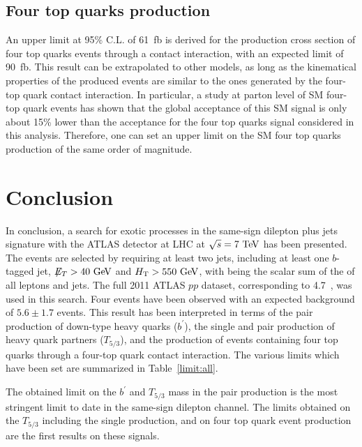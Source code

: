 \subsection{Four top quarks production}
An upper limit
at 95\% C.L. of 61~fb is derived for the production cross section of four top quarks events
through a contact interaction, with an expected limit of 90~fb.
This result can be extrapolated to other models, as long as the kinematical properties of the 
produced events are similar to the ones generated by the four-top quark contact interaction. In
particular, a study at parton level of SM four-top quark events has shown that the
global acceptance of this SM signal is only about 15\% lower than the acceptance
for the four top quarks signal considered in this analysis. Therefore, one can set an upper limit on the
SM four top quarks production of the same order of magnitude.

\section{Conclusion}\label{sect:conclusion}
In conclusion, a search for exotic processes in the same-sign dilepton plus jets signature with the
ATLAS detector at LHC at $\sqrt{s}=7 \TeV$
has been presented. The events are selected by requiring at least two jets, including at
least one $b$-tagged jet, $\met>40 \GeV$ and $\HT>550 \GeV$, with \HT{} being the scalar sum of the \pT{}
of all leptons and jets. The full 2011 ATLAS $pp$ dataset,
corresponding to 4.7~\ifb{}, was used in this search. Four events have been observed with an expected
background of $5.6\pm1.7$ events. This result has been interpreted in terms of the pair production 
of down-type heavy quarks ($b^\prime$), the single and pair production of heavy quark partners
($T_{5/3}$), and the production of events containing four top quarks through a four-top quark
contact interaction. The various limits which have been set are summarized in Table~\ref{limit:all}.

The obtained limit on the $b^\prime$ and $T_{5/3}$ mass in the pair production is the most stringent 
limit to date in the same-sign dilepton channel. The limits obtained on the $T_{5/3}$ including the
single production, and on four top quark event production are the first results on these signals.



